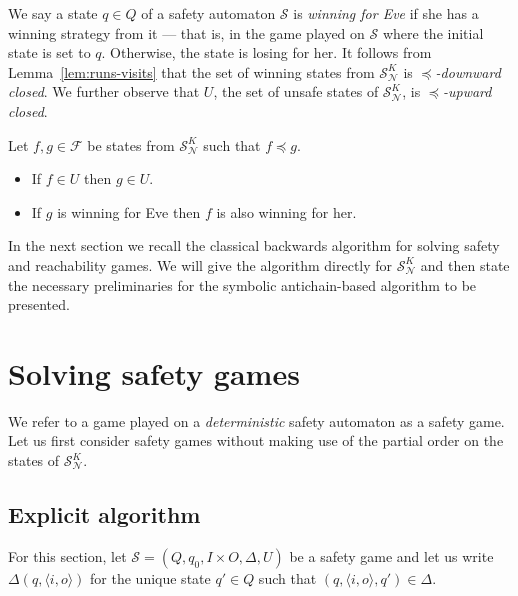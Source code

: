 \documentclass[runningheads,a4paper,draft]{llncs}
\newcommand{\eve}{Eve\xspace}
\newcommand{\calN}{\mathcal{N}}
\newcommand{\calS}{\mathcal{S}}
\begin{document}
We say a state $q \in Q$ of a safety automaton $\calS$ is \emph{winning for \eve}
if she has a winning strategy from it --- that is, in the game played on
\(\calS\) where the initial state is set to \(q\). Otherwise, the
state is losing for her. It follows from Lemma~\ref{lem:runs-visits} that the set of
winning states from $\calS^K_\calN$ is \emph{$\preceq$-downward closed}. We further
observe that $U$, the set of unsafe states of \(\calS^K_\calN\), is
\emph{$\preceq$-upward closed}.
\begin{proposition}\label{pro:down-closed}
  Let $f,g \in \mathcal{F}$ be states from $\calS^K_\calN$ such that $f
  \preceq g$.
  \begin{itemize}
    \item If $f \in U$ then $g \in U$.
    \item If $g$ is winning for \eve then $f$ is also winning for her.
  \end{itemize}
\end{proposition}

In the next section we recall the classical backwards algorithm for solving
safety and reachability games. We will give the algorithm directly for
$\calS^K_\calN$ and then state the necessary preliminaries for the symbolic
antichain-based algorithm to be presented.

\section{Solving safety games}
We refer to a game played on a \emph{deterministic} safety automaton as a safety
game. Let us first consider safety games without making use of the partial order
on the states of \(\calS^K_\calN\).

\subsection{Explicit algorithm}
For this section, let $\calS = (Q,q_0, I \times O, \Delta, U)$ be a safety
game and let us write $\Delta(q,\langle i, o \rangle)$ for the unique state
$q' \in Q$ such that $(q, \langle i, o \rangle, q') \in \Delta$.
\end{document}
